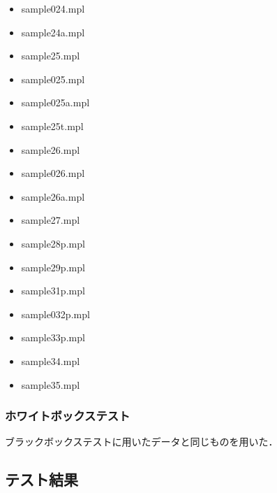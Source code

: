 \documentclass{jlreq}
\begin{document}
\begin{itemize}
  \item sample024.mpl
  \item sample24a.mpl
  \item sample25.mpl
  \item sample025.mpl
  \item sample025a.mpl
  \item sample25t.mpl
  \item sample26.mpl
  \item sample026.mpl
  \item sample26a.mpl
  \item sample27.mpl
  \item sample28p.mpl
  \item sample29p.mpl
  \item sample31p.mpl
  \item sample032p.mpl
  \item sample33p.mpl
  \item sample34.mpl
  \item sample35.mpl
\end{itemize}

\subsubsection{ホワイトボックステスト}
ブラックボックステストに用いたデータと同じものを用いた．

\subsection{テスト結果}
\end{document}
